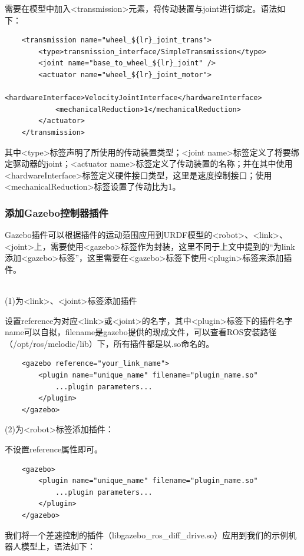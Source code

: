 \documentclass[9pt, oneside]{book}
\begin{document}
需要在模型中加入<transmission>元素，将传动装置与joint进行绑定。语法如下：

\begin{verbatim}
    <transmission name="wheel_${lr}_joint_trans">
        <type>transmission_interface/SimpleTransmission</type>
        <joint name="base_to_wheel_${lr}_joint" />
        <actuator name="wheel_${lr}_joint_motor">
            <hardwareInterface>VelocityJointInterface</hardwareInterface>
            <mechanicalReduction>1</mechanicalReduction>
        </actuator>
    </transmission>
\end{verbatim}

其中<type>标签声明了所使用的传动装置类型；<joint name>标签定义了将要绑定驱动器的joint；<actuator name>标签定义了传动装置的名称；并在其中使用<hardwareInterface>标签定义硬件接口类型，这里是速度控制接口；使用<mechanicalReduction>标签设置了传动比为1。

\subsubsection{添加Gazebo控制器插件}

Gazebo插件可以根据插件的运动范围应用到URDF模型的<robot>、<link>、<joint>上，需要使用<gazebo>标签作为封装，这里不同于上文中提到的“为link添加<gazebo>标签”，这里需要在<gazebo>标签下使用<plugin>标签来添加插件。

~\\
\noindent(1)为<link>、<joint>标签添加插件

设置reference为对应<link>或<joint>的名字，其中<plugin>标签下的插件名字name可以自拟，filename是gazebo提供的现成文件，可以查看ROS安装路径（/opt/ros/melodic/lib）下，所有插件都是以.so命名的。

\begin{verbatim}
    <gazebo reference="your_link_name">
        <plugin name="unique_name" filename="plugin_name.so"
            ...plugin parameters...
        </plugin>
    </gazebo>
\end{verbatim}

\noindent(2)为<robot>标签添加插件：

不设置reference属性即可。

\begin{verbatim}
    <gazebo>
        <plugin name="unique_name" filename="plugin_name.so"
            ...plugin parameters...
        </plugin>
    </gazebo>
\end{verbatim}

我们将一个差速控制的插件（libgazebo\_ros\_diff\_drive.so）应用到我们的示例机器人模型上，语法如下：
\end{document}
